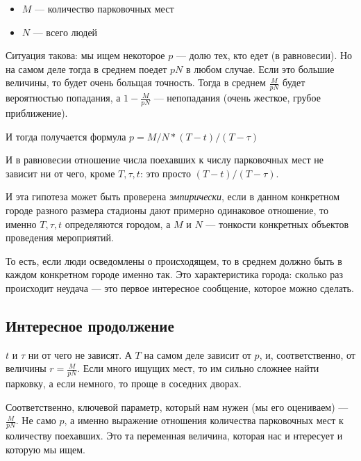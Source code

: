 \begin{itemize}
	\item $M$ --- количество парковочных мест
	\item $N$ --- всего людей
\end{itemize}

Ситуация такова: мы ищем некоторое $p$ --- долю тех, кто едет (в равновесии).
Но на самом деле тогда в среднем поедет $pN$ в любом случае.
Если это большие величины, то будет очень больщая точность.
Тогда в среднем $\frac{M}{pN}$ будет вероятностью попадания, а $1 - \frac{M}{pN}$ --- непопадания (очень жесткое, грубое приближение).

И тогда получается формула $p = M/N * (T-t) / (T-\tau)$

И в равновесии отношение числа поехавших к числу парковочных мест не зависит ни от чего, кроме $T, \tau, t$: это просто $(T-t)/(T-\tau)$.

И эта гипотеза может быть проверена \textit{эмпирически}, если в данном конкретном городе разного размера стадионы дают примерно одинаковое отношение, то именно $T, \tau, t$ определяются городом, а $M$ и $N$ --- тонкости конкретных объектов проведения мероприятий.

То есть, если люди осведомлены о происходящем, то в среднем должно быть в каждом конкретном городе именно так. Это характеристика города: сколько раз происходит неудача
 --- это первое интересное сообщение, которое можно сделать.

\subsection{Интересное продолжение}

$t$ и $\tau$ ни от чего не зависят.
А $T$ на самом деле зависит от $p$, и, соответственно, от величины $r= \frac{M}{pN}$.
Если много ищущих мест, то им сильно сложнее найти парковку, а если немного, то проще в соседних дворах.

Соответственно, ключевой параметр, который нам нужен (мы его оцениваем) --- $\frac{M}{pN}$. Не само $p$, а именно выражение отношения количества парковочных мест к количеству поехавших. Это та переменная величина, которая нас и нтересует и которую мы ищем.

